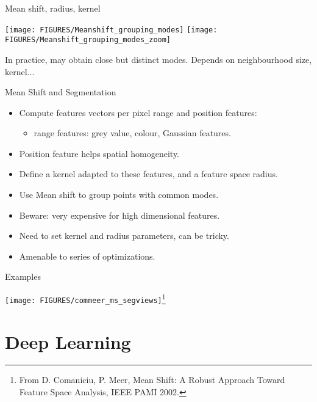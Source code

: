 \documentclass[9pt]{beamer}
\begin{document}
\begin{frame}{Mean shift, radius, kernel}
 \begin{center}
    \texttt{[image: FIGURES/Meanshift\_grouping\_modes]}\hfill
    \texttt{[image: FIGURES/Meanshift\_grouping\_modes\_zoom]}\\
  \end{center}
  In practice, may obtain close but distinct modes. Depends on neighbourhood size, kernel...
\end{frame}


\begin{frame}{Mean Shift and Segmentation}
  \begin{itemize}
  \item Compute features vectors per pixel range and position features: 
    \begin{itemize}
    \item range features: grey value, colour, Gaussian features.
    \end{itemize}
  \item Position feature helps spatial homogeneity.
  \item Define a kernel adapted to these features, and a feature space radius.
  \item Use Mean shift to group points with common modes.  
  \item Beware: very expensive for high dimensional features.
  \item Need to set kernel and radius parameters, can be tricky.
  \item Amenable to series of optimizations.
    
  \end{itemize}  
\end{frame}


\begin{frame}{Examples}
  \begin{center}
    \texttt{[image: FIGURES/commeer\_ms\_segviews]}\footnote{From
    D. Comaniciu, P. Meer, Mean Shift: A Robust Approach Toward
    Feature Space Analysis, IEEE PAMI 2002.}
  \end{center}
\end{frame}


\section{Deep Learning}
\end{document}
